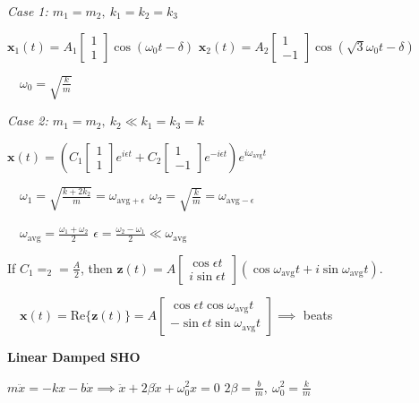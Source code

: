 \documentclass[twocolumn]{article}
\begin{document}
\vspace{-.5em}
\dotfill

\textit{Case 1: $m_1 = m_2,\ k_1 = k_2 = k_3$}

$\mathbf{x}_1(t) = A_1 \begin{bmatrix} 1 \\ 1 \end{bmatrix} \cos(\omega_0 t - \delta)$ \hfill $\mathbf{x}_2(t) = A_2 \begin{bmatrix} 1 \\ -1 \end{bmatrix} \cos(\sqrt{3} \omega_0 t - \delta)$

$\quad \omega_0 = \sqrt{\frac{k}{m}}$

\dotfill

\textit{Case 2: $m_1 = m_2,\ k_2 \ll k_1 = k_3 = k$}

$\mathbf{x}(t) = \left( C_1 \begin{bmatrix} 1 \\ 1 \end{bmatrix} e^{i \epsilon t} + C_2 \begin{bmatrix} 1 \\ -1 \end{bmatrix} e^{-i \epsilon t} \right) e^{i \omega_{\text{avg}} t}$

$\quad \omega_1 = \sqrt{\frac{k+2k_2}{m}} = \omega_{\text{avg} + \epsilon}$ \hfill $\omega_2 = \sqrt{\frac{k}{m}} = \omega_{\text{avg} - \epsilon}$

$\quad \omega_{\text{avg}} = \frac{\omega_1 + \omega_2}{2}$ \hfill $\epsilon = \frac{\omega_2 - \omega_1}{2} \ll \omega_{\text{avg}}$

If $C_1 = _2 = \frac{A}{2}$, then $\mathbf{z}(t) = A \begin{bmatrix} \cos \epsilon t \\ i \sin \epsilon t \end{bmatrix} (\cos \omega_{\text{avg}}t + i \sin \omega_{\text{avg}} t)$.

$\quad \mathbf{x}(t) = \text{Re} \{ \mathbf{z}(t) \} = A \begin{bmatrix} \cos\epsilon t \cos \omega_{\text{avg}} t \\ -\sin \epsilon t \sin \omega_{\text{avg}} t \end{bmatrix} \implies$ beats


\newpage


\textbf{Linear Damped SHO}

$m\ddot{x} = -kx - b\dot{x} \implies \ddot{x} + 2\beta\dot{x} + \omega_0^2 x = 0$ \hfill $2 \beta = \frac{b}{m},\ \omega_0^2 = \frac{k}{m}$
\end{document}
